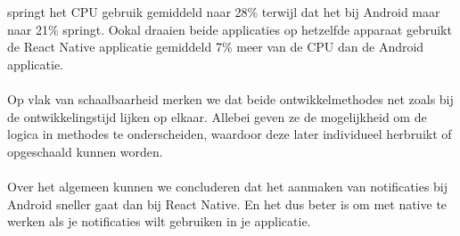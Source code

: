springt het CPU gebruik gemiddeld naar 28\% terwijl dat het bij Android maar naar 21\% springt. Ookal 
draaien beide applicaties op hetzelfde apparaat gebruikt de React Native applicatie gemiddeld 7\% meer 
van de CPU dan de Android applicatie.
\\\\
Op vlak van schaalbaarheid merken we dat beide ontwikkelmethodes net zoals bij de ontwikkelingstijd 
lijken op elkaar. Allebei geven ze de mogelijkheid om de logica in methodes te onderscheiden, 
waardoor deze later individueel herbruikt of opgeschaald kunnen worden.
\\\\
Over het algemeen kunnen we concluderen dat het aanmaken van notificaties bij Android sneller gaat dan bij
React Native. En het dus beter is om met native te werken als je notificaties wilt gebruiken in je applicatie.























